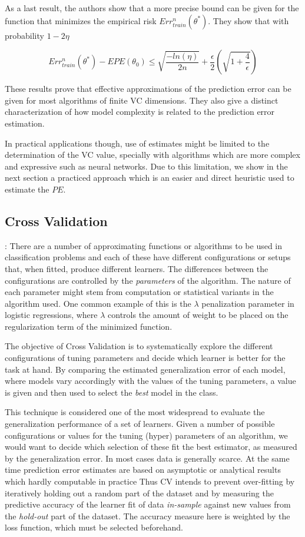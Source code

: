 As a last result, the authors show that a more precise bound can be given for the function that minimizes the empirical risk $Err^n_{train}(\theta^*)$. They show that with probability $1 - 2\eta$

\begin{equation}\label{vapnik-classificationBoundPrecise}
Err^n_{train}(\theta^*) - EPE(\theta_0) \leq \sqrt{\frac{-ln(\eta)}{2n} } + \frac{\epsilon}{2}\left( \sqrt{1 + \frac{4}{\epsilon} } \right)
\end{equation}

These results prove that effective approximations of the prediction error can be given for most algorithms of finite VC dimensions. They also give a distinct characterization of how model complexity is related to the prediction error estimation.

In practical applications though, use of estimates might be limited to the determination of the VC value, specially with algorithms which are more complex and expressive such as neural networks. Due to this limitation, we show in the next section a practiced approach which is an easier and direct heuristic used to estimate the $PE$.


\subsection{Cross Validation}:
 There are a number of approximating functions or algorithms to be used in classification problems and each of these have different configurations or setups that, when fitted, produce different learners. The differences between the configurations are controlled by the \textit{parameters} of the algorithm. The nature of each parameter might stem from computation or statistical variants in the algorithm used. One common example of this is the $\lambda$ penalization parameter in logistic regressions, where $\lambda$ controls the amount of weight to be placed on the regularization term of the minimized function.

The objective of Cross Validation is to systematically explore the different configurations of tuning parameters and decide which learner is better for the task at hand. By comparing the estimated generalization error of each model, where models vary accordingly with the values of the tuning parameters, a value is given and then used to select the \textit{best} model in the class.

This technique is considered one of the most widespread to evaluate the generalization performance of a set of learners. Given a number of possible configurations or values for the tuning (hyper) parameters of an algorithm, we would want to decide which selection of these fit the best estimator, as measured by the generalization error. In most cases data is generally scarce. At the same time prediction error estimates are based on asymptotic or analytical results which hardly computable in practice Thus CV intends to prevent over-fitting by iteratively holding out a random part of the dataset and by measuring the predictive accuracy of the learner fit of data \textit{in-sample} against new values from the \textit{hold-out} part of the dataset. The accuracy measure here is weighted by the loss function, which must be selected beforehand.


